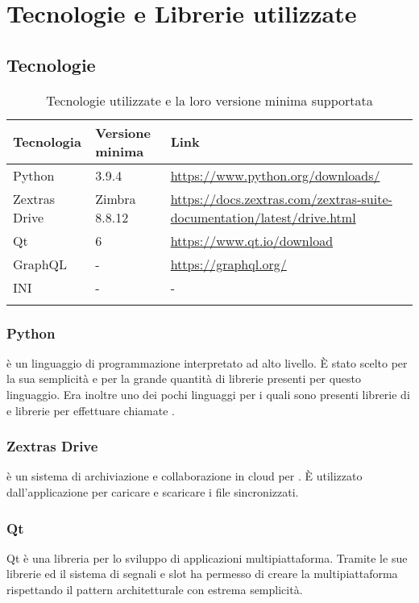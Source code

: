 \section{Tecnologie e Librerie utilizzate}

\subsection{Tecnologie}
{
	\setlength{\freewidth}{\dimexpr\textwidth-1\tabcolsep}
	\renewcommand{\arraystretch}{1.5}
	\setlength{\aboverulesep}{0pt}
	\setlength{\belowrulesep}{0pt}
	\begin{longtable}{L{.15\freewidth} L{.20\freewidth} L{.60\freewidth}}
		\textbf{Tecnologia} & \textbf{Versione minima} & \textbf{Link}\\
		\toprule
		\endhead	
		Python & 3.9.4 & \url{https://www.python.org/downloads/}\\
		Zextras Drive & Zimbra 8.8.12 &  \url{https://docs.zextras.com/zextras-suite-documentation/latest/drive.html}\\	
		Qt & 6 & \url{https://www.qt.io/download}\\
		GraphQL & - & \url{https://graphql.org/} \\
		INI & - & -\\
		\bottomrule
		\hiderowcolors
		\caption{Tecnologie utilizzate e la loro versione minima supportata}
	\end{longtable}
\subsubsection{Python}
 è un linguaggio di programmazione interpretato ad alto livello. È stato scelto per la sua semplicità e per la grande quantità di librerie presenti per questo linguaggio. Era inoltre uno dei pochi linguaggi per i quali sono presenti librerie di  e librerie per effettuare chiamate .
\subsubsection{Zextras Drive}
 è un sistema di archiviazione e collaborazione in cloud per . È utilizzato dall'applicazione per caricare e scaricare i file sincronizzati.
\subsubsection{Qt}
Qt è una libreria per lo sviluppo di applicazioni multipiattaforma. Tramite le sue librerie ed il sistema di segnali e slot ha permesso di creare la  multipiattaforma rispettando il pattern architetturale  con estrema semplicità.
}
